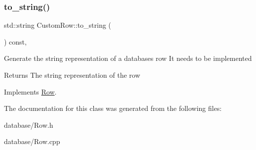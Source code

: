 \subsubsection{\texorpdfstring{to\+\_\+string()}{to\_string()}}
{\footnotesize\ttfamily std\+::string Custom\+Row\+::to\+\_\+string (\begin{DoxyParamCaption}{ }\end{DoxyParamCaption}) const\hspace{0.3cm}{\ttfamily [override]}, {\ttfamily [virtual]}}

Generate the string representation of a database\textquotesingle{}s row It needs to be implemented

\begin{DoxyReturn}{Returns}
The string representation of the row 
\end{DoxyReturn}


Implements \mbox{\hyperlink{classRow_ae7b1aba7a4c868914700432850c2848d}{Row}}.



The documentation for this class was generated from the following files\+:\begin{DoxyCompactItemize}
\item 
database/Row.\+h\item 
database/Row.\+cpp\end{DoxyCompactItemize}
